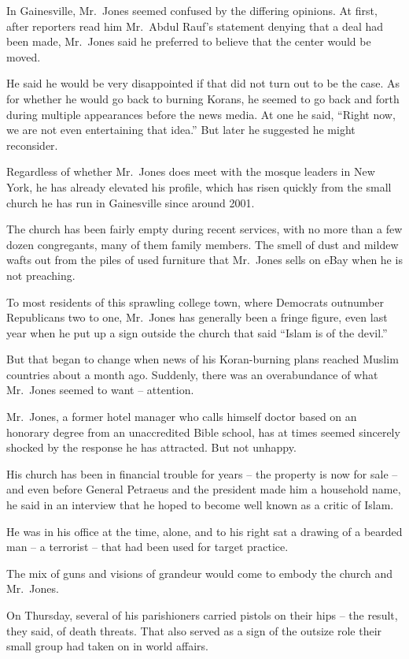 ﻿\documentclass[12pt]{article}
\begin{document}
In Gainesville, Mr.~Jones seemed confused by the differing opinions. At first, after reporters read
him Mr.~Abdul Rauf's statement denying that a deal had been made, Mr.~Jones said he preferred to
believe that the center would be moved.

He said he would be very disappointed if that did not turn out to be the case. As for whether he
would go back to burning Korans, he seemed to go back and forth during multiple appearances before
the news media. At one he said, ``Right now, we are not even entertaining that idea.'' But later he
suggested he might reconsider.

Regardless of whether Mr.~Jones does meet with the mosque leaders in New York, he has already
elevated his profile, which has risen quickly from the small church he has run in Gainesville since
around 2001.

The church has been fairly empty during recent services, with no more than a few dozen congregants,
many of them family members. The smell of dust and mildew wafts out from the piles of used furniture
that Mr.~Jones sells on eBay when he is not preaching.

To most residents of this sprawling college town, where Democrats outnumber Republicans two to one,
Mr.~Jones has generally been a fringe figure, even last year when he put up a sign outside the
church that said ``Islam is of the devil.''

But that began to change when news of his Koran-burning plans reached Muslim countries about a month
ago. Suddenly, there was an overabundance of what Mr.~Jones seemed to want -- attention.

Mr.~Jones, a former hotel manager who calls himself doctor based on an honorary degree from an
unaccredited Bible school, has at times seemed sincerely shocked by the response he has attracted.
But not unhappy.

His church has been in financial trouble for years -- the property is now for sale -- and even
before General Petraeus and the president made him a household name, he said in an interview that he
hoped to become well known as a critic of Islam.

He was in his office at the time, alone, and to his right sat a drawing of a bearded man -- a
terrorist -- that had been used for target practice.

The mix of guns and visions of grandeur would come to embody the church and Mr.~Jones.

On Thursday, several of his parishioners carried pistols on their hips -- the result, they said, of
death threats. That also served as a sign of the outsize role their small group had taken on in
world affairs.
\end{document}
